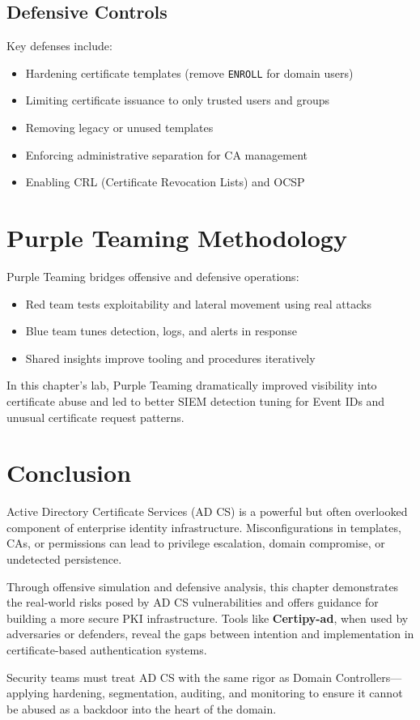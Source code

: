 \subsection{Defensive Controls}

Key defenses include:
\begin{itemize}
    \item Hardening certificate templates (remove \texttt{ENROLL} for domain users)
    \item Limiting certificate issuance to only trusted users and groups
    \item Removing legacy or unused templates
    \item Enforcing administrative separation for CA management
    \item Enabling CRL (Certificate Revocation Lists) and OCSP
\end{itemize}

\section{Purple Teaming Methodology}

Purple Teaming bridges offensive and defensive operations:
\begin{itemize}
    \item Red team tests exploitability and lateral movement using real attacks
    \item Blue team tunes detection, logs, and alerts in response
    \item Shared insights improve tooling and procedures iteratively
\end{itemize}

In this chapter’s lab, Purple Teaming dramatically improved visibility into certificate abuse and led to better SIEM detection tuning for Event IDs and unusual certificate request patterns.

\section{Conclusion}

Active Directory Certificate Services (AD CS) is a powerful but often overlooked component of enterprise identity infrastructure. Misconfigurations in templates, CAs, or permissions can lead to privilege escalation, domain compromise, or undetected persistence.

Through offensive simulation and defensive analysis, this chapter demonstrates the real-world risks posed by AD CS vulnerabilities and offers guidance for building a more secure PKI infrastructure. Tools like \textbf{Certipy-ad}, when used by adversaries or defenders, reveal the gaps between intention and implementation in certificate-based authentication systems.

Security teams must treat AD CS with the same rigor as Domain Controllers—applying hardening, segmentation, auditing, and monitoring to ensure it cannot be abused as a backdoor into the heart of the domain.
